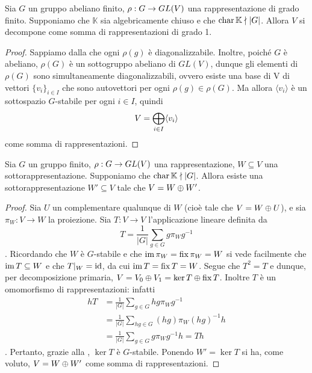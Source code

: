 \begin{proposition}
Sia $G$ un gruppo abeliano finito, $\rho:G\to GL(V)$ una rappresentazione di grado finito. Supponiamo che $\mathbb{K}$ sia algebricamente chiuso e che $\operatorname{char}\mathbb{K}\nmid |G|$. Allora $V$ si decompone come somma di rappresentazioni di grado 1.
\end{proposition}
\begin{proof}
Sappiamo dalla  che ogni $\rho(g)$ è diagonalizzabile. Inoltre, poiché $G$ è abeliano, $\rho(G)$ è un sottogruppo abeliano di $GL(V)$, dunque gli elementi di $\rho(G)$ sono simultaneamente diagonalizzabili, ovvero esiste una base di V  di vettori $\{v_i\}_{i\in I}$ che sono autovettori per ogni $\rho(g)\in\rho(G)$. Ma allora $\langle v_i\rangle$ è un sottospazio $G$-stabile per ogni $i\in I$, quindi
$$
V=\bigoplus_{i\in I}\langle v_i\rangle
$$
come somma di rappresentazioni.
\end{proof}

\begin{proposition}
Sia $G$ un gruppo finito, $\rho:G\to GL(V)$ una rappresentazione, $W\subseteq V$ una sottorappresentazione. Supponiamo che $\operatorname{char}\mathbb{K}\nmid|G|$. Allora esiste una sottorappresentazione $W'\subseteq V$ tale che $V=W\oplus W'$.
\end{proposition}
\begin{proof}
Sia $U$ un complementare qualunque di $W$ (cioè tale che $V=W\oplus U$), e sia $\pi_W:V\to W$ la proiezione. Sia $T:V\to V$ l'applicazione lineare definita da
$$
T=\frac{1}{|G|}\sum_{g\in G}g\pi_Wg^{-1}
$$
. Ricordando che $W$ è $G$-stabile e che $\operatorname{im}\pi_W=\operatorname{fix}\pi_W=W$ si vede facilmente che $\operatorname{im} T\subseteq W$ e che $T|_W=\operatorname{id}$, da cui $\operatorname{im} T=\operatorname{fix} T=W$. Segue che $T^2=T$ e dunque, per decomposizione primaria, $V=V_0\oplus V_1=\ker T\oplus\operatorname{fix} T$. Inoltre $T$ è un omomorfismo di rappresentazioni: infatti
\begin{align*}
hT&=\frac{1}{|G|}\sum_{g\in G}hg\pi_Wg^{-1}\\
&=\frac{1}{|G|}\sum_{hg\in G}(hg)\pi_W(hg)^{-1}h\\
&=\frac{1}{|G|}\sum_{g\in G}g\pi_Wg^{-1}h=Th
\end{align*}
. Pertanto, grazie alla , $\ker T$ è $G$-stabile. Ponendo $W'=\ker T$ si ha, come voluto, $V=W\oplus W'$  come somma di rappresentazioni.
\end{proof}

